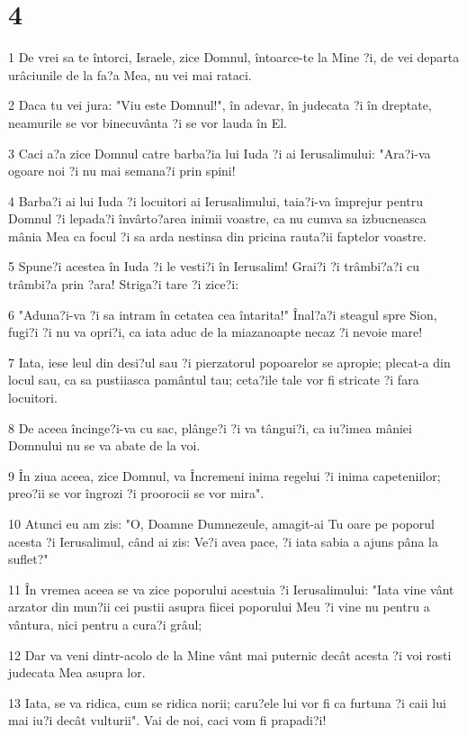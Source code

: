 \chapter{4}

\par 1 De vrei sa te întorci, Israele, zice Domnul, întoarce-te la Mine ?i, de vei departa urâciunile de la fa?a Mea, nu vei mai rataci.
\par 2 Daca tu vei jura: "Viu este Domnul!", în adevar, în judecata ?i în dreptate, neamurile se vor binecuvânta ?i se vor lauda în El.
\par 3 Caci a?a zice Domnul catre barba?ia lui Iuda ?i ai Ierusalimului: "Ara?i-va ogoare noi ?i nu mai semana?i prin spini!
\par 4 Barba?i ai lui Iuda ?i locuitori ai Ierusalimului, taia?i-va împrejur pentru Domnul ?i lepada?i învârto?area inimii voastre, ca nu cumva sa izbucneasca mânia Mea ca focul ?i sa arda nestinsa din pricina rauta?ii faptelor voastre.
\par 5 Spune?i acestea în Iuda ?i le vesti?i în Ierusalim! Grai?i ?i trâmbi?a?i cu trâmbi?a prin ?ara! Striga?i tare ?i zice?i:
\par 6 "Aduna?i-va ?i sa intram în cetatea cea întarita!" Înal?a?i steagul spre Sion, fugi?i ?i nu va opri?i, ca iata aduc de la miazanoapte necaz ?i nevoie mare!
\par 7 Iata, iese leul din desi?ul sau ?i pierzatorul popoarelor se apropie; plecat-a din locul sau, ca sa pustiiasca pamântul tau; ceta?ile tale vor fi stricate ?i fara locuitori.
\par 8 De aceea încinge?i-va cu sac, plânge?i ?i va tângui?i, ca iu?imea mâniei Domnului nu se va abate de la voi.
\par 9 În ziua aceea, zice Domnul, va Încremeni inima regelui ?i inima capeteniilor; preo?ii se vor îngrozi ?i proorocii se vor mira".
\par 10 Atunci eu am zis: "O, Doamne Dumnezeule, amagit-ai Tu oare pe poporul acesta ?i Ierusalimul, când ai zis: Ve?i avea pace, ?i iata sabia a ajuns pâna la suflet?"
\par 11 În vremea aceea se va zice poporului acestuia ?i Ierusalimului: "Iata vine vânt arzator din mun?ii cei pustii asupra fiicei poporului Meu ?i vine nu pentru a vântura, nici pentru a cura?i grâul;
\par 12 Dar va veni dintr-acolo de la Mine vânt mai puternic decât acesta ?i voi rosti judecata Mea asupra lor.
\par 13 Iata, se va ridica, cum se ridica norii; caru?ele lui vor fi ca furtuna ?i caii lui mai iu?i decât vulturii". Vai de noi, caci vom fi prapadi?i!
